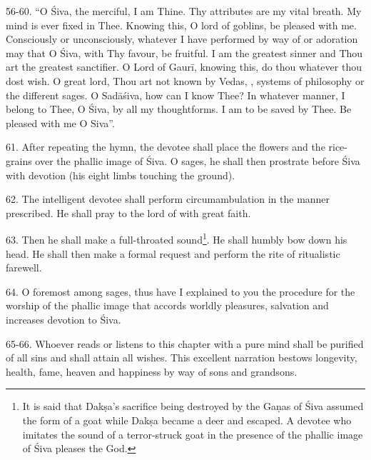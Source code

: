 56-60. “O Śiva, the merciful, I am Thine. Thy attributes are my vital breath.
My mind is ever fixed in Thee. Knowing this, O lord of goblins, be pleased with
me. Consciously or unconsciously, whatever I have performed by way of 
or adoration may that O Śiva, with Thy favour, be fruitful. I am the greatest
sinner and Thou art the greatest sanctifier. O Lord of Gaurī, knowing this, do
thou whatever thou dost wish. O great lord, Thou art not known by Vedas,
, systems of philosophy or the different sages. O Sadāśiva, how can
I know Thee? In whatever manner, I belong to Thee, O Śiva, by all my
thoughtforms. I am to be saved by Thee. Be pleased with me O Siva”.

61. After repeating the hymn, the devotee shall place the flowers and the rice-
grains over the phallic image of Śiva. O sages, he shall then prostrate before
Śiva with devotion (his eight limbs touching the ground).

62. The intelligent devotee shall perform circumambulation in the manner
prescribed. He shall pray to the lord of  with great faith.

63. Then he shall make a full-throated sound\footnote{It is said that Dakṣa’s
sacrifice being destroyed by the Gaṇas of Śiva assumed the form of a goat while
Dakṣa became a deer and escaped. A devotee who imitates the sound of
a terror-struck goat in the presence of the phallic image of Śiva pleases
the God.}. He shall humbly bow down his head. He shall then make a formal
request and perform the rite of ritualistic farewell.

64. O foremost among sages, thus have I explained to you the procedure for
the worship of the phallic image that accords worldly pleasures, salvation and
increases devotion to Śiva.

65-66. Whoever reads or listens to this chapter with a pure mind shall be
purified of all sins and shall attain all wishes. This excellent narration
bestows longevity, health, fame, heaven and happiness by way of sons and
grandsons.
